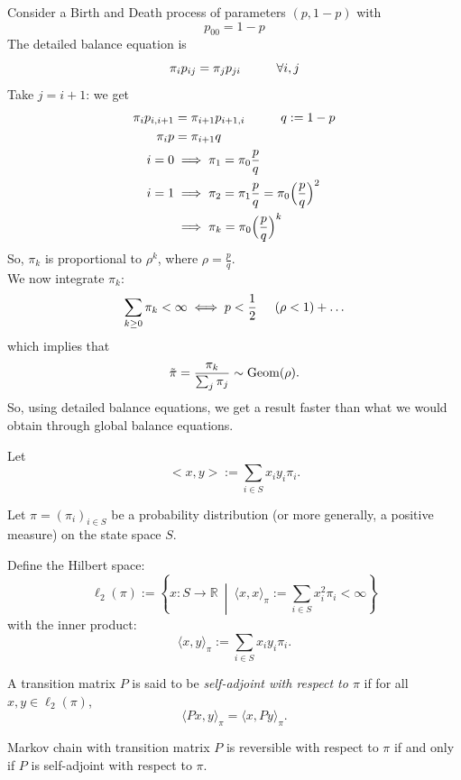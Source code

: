 \documentclass{article}
\begin{document}
\begin{example}
    Consider a Birth and Death process of parameters $(p,1-p)$ with 
    \begin{equation*}
        p_{00} = 1-p
    \end{equation*}
    The detailed balance equation is
    \begin{equation*}
        \pi_i p_{ij} = \pi_j p_{ji}   \hspace{1 cm} \forall i,j
    \end{equation*}
    Take $j=i+1$: we get
    \begin{align*}
        \pi_i p_{i,i+1} &= \pi_{i+1} p_{i+1,i}  \hspace{1 cm} q:=1-p \\
        \pi_i p &= \pi_{i+1} q\\
        i = 0 &\implies \pi_1 = \pi_0 \frac{p}{q}\\
        i = 1 &\implies \pi_2 = \pi_1 \frac{p}{q} = \pi_0 \Big(\frac{p}{q}\Big)^2 \\
        &\implies \pi_k = \pi_0 \Big(\frac{p}{q}\Big)^k
    \end{align*}
    So, $\pi_k$ is proportional to $\rho^k$, where $\rho = \frac{p}{q}$. \\
    We now integrate $\pi_k$:
    \begin{equation*}
        \sum_{k \geq 0} \pi_k < \infty \iff p < \frac{1}{2} \hspace{0.5 cm} (\rho < 1) + \ldots
    \end{equation*}
    which implies that 
    \begin{equation*}
        \Tilde{\pi} = \frac{\pi_k}{\sum_j \pi_j} \sim \text{Geom}(\rho).
    \end{equation*}
    So, using detailed balance equations, we get a result faster than what we would obtain through global balance equations.
\end{example}
Let 
\begin{equation*}
    <x,y>:= \sum_{i \in S} x_i y_i \pi_i.
\end{equation*}
\begin{definition}
    Let \( \pi = (\pi_i)_{i \in S} \) be a probability distribution (or more generally, a positive measure) on the state space \( S \).
    
    Define the Hilbert space:
    \[
    \ell_2(\pi) := \left\{ x : S \to \mathbb{R} \ \middle| \ \langle x, x \rangle_\pi := \sum_{i \in S} x_i^2 \pi_i < \infty \right\}
    \]
    with the inner product:
    \[
    \langle x, y \rangle_\pi := \sum_{i \in S} x_i y_i \pi_i.
    \]

    A transition matrix \( P \) is said to be \emph{self-adjoint with respect to \( \pi \)} if for all \( x, y \in \ell_2(\pi) \),
    \[
    \langle Px, y \rangle_\pi = \langle x, Py \rangle_\pi.
    \]
\end{definition}\begin{proposition} Markov chain with transition matrix $P$ is reversible with respect to $\pi$ if and only if $P$ is self-adjoint with respect to $\pi$.
\end{proposition}
\end{document}
